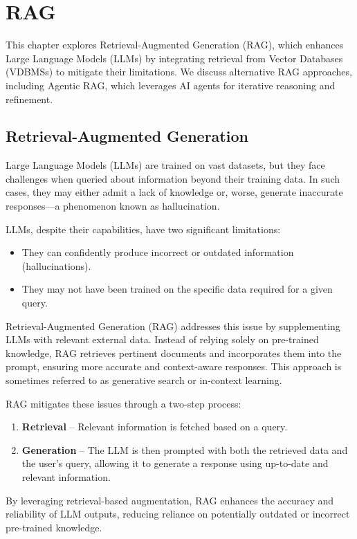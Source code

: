 \pagestyle{fancy}
\chapter{RAG}  
\label{chap:RAG}  
This chapter explores Retrieval-Augmented Generation (RAG), which enhances Large Language Models (LLMs) by integrating retrieval from Vector Databases (VDBMSs) to mitigate their limitations. We discuss alternative RAG approaches, including Agentic RAG, which leverages AI agents for iterative reasoning and refinement.


\section{Retrieval-Augmented Generation}  
Large Language Models (LLMs) are trained on vast datasets, but they face challenges when queried about information beyond their training data. In such cases, they may either admit a lack of knowledge or, worse, generate inaccurate responses—a phenomenon known as hallucination. 

LLMs, despite their capabilities, have two significant limitations:  
\begin{itemize}  
    \item They can confidently produce incorrect or outdated information (hallucinations).  
    \item They may not have been trained on the specific data required for a given query.  
\end{itemize}  


Retrieval-Augmented Generation (RAG) addresses this issue by supplementing LLMs with relevant external data. Instead of relying solely on pre-trained knowledge, RAG retrieves pertinent documents and incorporates them into the prompt, ensuring more accurate and context-aware responses. This approach is sometimes referred to as generative search or in-context learning.  

RAG mitigates these issues through a two-step process:  
\begin{enumerate}  
    \item \textbf{Retrieval} – Relevant information is fetched based on a query.  
    \item \textbf{Generation} – The LLM is then prompted with both the retrieved data and the user's query, allowing it to generate a response using up-to-date and relevant information.  
\end{enumerate}  

By leveraging retrieval-based augmentation, RAG enhances the accuracy and reliability of LLM outputs, reducing reliance on potentially outdated or incorrect pre-trained knowledge.



